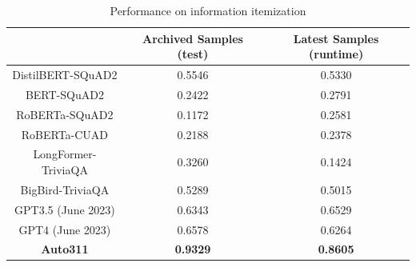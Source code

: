 \begin{table}[h]
\centering
\caption{Performance on information itemization}
\scriptsize
\begin{tabular}{||c|c|c||}
\hline
           & Archived Samples (test) & Latest Samples (runtime)  \\ \hline\hline
DistilBERT-SQuAD2 &  0.5546    & 0.5330                        \\ \hline        
BERT-SQuAD2 &   0.2422   & 0.2791                        \\ \hline
RoBERTa-SQuAD2 &   0.1172   & 0.2581                        \\ \hline
RoBERTa-CUAD &   0.2188   & 0.2378                        \\ \hline
LongFormer-TriviaQA &   0.3260   & 0.1424                        \\ \hline
BigBird-TriviaQA &   0.5289   &     0.5015                    \\ \hline
GPT3.5 (June 2023)     &   0.6343   & 0.6529                         \\ \hline
GPT4 (June 2023)      &   0.6578   & 0.6264                          \\ \hline
\textbf{Auto311}   &   \textbf{0.9329}   & \textbf{0.8605}          \\ \hline
\end{tabular}
\label{tab:informationextraction}
\end{table}


